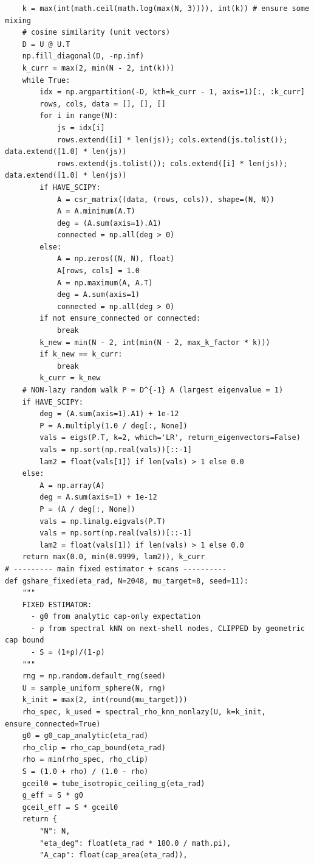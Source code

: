 \documentclass[11pt]{article}
\begin{document}
\begin{verbatim}
    k = max(int(math.ceil(math.log(max(N, 3)))), int(k)) # ensure some mixing
    # cosine similarity (unit vectors)
    D = U @ U.T
    np.fill_diagonal(D, -np.inf)
    k_curr = max(2, min(N - 2, int(k)))
    while True:
        idx = np.argpartition(-D, kth=k_curr - 1, axis=1)[:, :k_curr]
        rows, cols, data = [], [], []
        for i in range(N):
            js = idx[i]
            rows.extend([i] * len(js)); cols.extend(js.tolist()); data.extend([1.0] * len(js))
            rows.extend(js.tolist()); cols.extend([i] * len(js)); data.extend([1.0] * len(js))
        if HAVE_SCIPY:
            A = csr_matrix((data, (rows, cols)), shape=(N, N))
            A = A.minimum(A.T)
            deg = (A.sum(axis=1).A1)
            connected = np.all(deg > 0)
        else:
            A = np.zeros((N, N), float)
            A[rows, cols] = 1.0
            A = np.maximum(A, A.T)
            deg = A.sum(axis=1)
            connected = np.all(deg > 0)
        if not ensure_connected or connected:
            break
        k_new = min(N - 2, int(min(N - 2, max_k_factor * k)))
        if k_new == k_curr:
            break
        k_curr = k_new
    # NON-lazy random walk P = D^{-1} A (largest eigenvalue = 1)
    if HAVE_SCIPY:
        deg = (A.sum(axis=1).A1) + 1e-12
        P = A.multiply(1.0 / deg[:, None])
        vals = eigs(P.T, k=2, which='LR', return_eigenvectors=False)
        vals = np.sort(np.real(vals))[::-1]
        lam2 = float(vals[1]) if len(vals) > 1 else 0.0
    else:
        A = np.array(A)
        deg = A.sum(axis=1) + 1e-12
        P = (A / deg[:, None])
        vals = np.linalg.eigvals(P.T)
        vals = np.sort(np.real(vals))[::-1]
        lam2 = float(vals[1]) if len(vals) > 1 else 0.0
    return max(0.0, min(0.9999, lam2)), k_curr
# --------- main fixed estimator + scans ----------
def gshare_fixed(eta_rad, N=2048, mu_target=8, seed=11):
    """
    FIXED ESTIMATOR:
      - g0 from analytic cap-only expectation
      - ρ from spectral kNN on next-shell nodes, CLIPPED by geometric cap bound
      - S = (1+ρ)/(1-ρ)
    """
    rng = np.random.default_rng(seed)
    U = sample_uniform_sphere(N, rng)
    k_init = max(2, int(round(mu_target)))
    rho_spec, k_used = spectral_rho_knn_nonlazy(U, k=k_init, ensure_connected=True)
    g0 = g0_cap_analytic(eta_rad)
    rho_clip = rho_cap_bound(eta_rad)
    rho = min(rho_spec, rho_clip)
    S = (1.0 + rho) / (1.0 - rho)
    gceil0 = tube_isotropic_ceiling_g(eta_rad)
    g_eff = S * g0
    gceil_eff = S * gceil0
    return {
        "N": N,
        "eta_deg": float(eta_rad * 180.0 / math.pi),
        "A_cap": float(cap_area(eta_rad)),

\end{verbatim}
\end{document}
